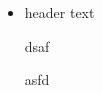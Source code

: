 \begin{itemize}
	\item<+>[]
		\begin{block}{header} 
			text
			 
			dsaf
			
			asfd
		\end{block}\vspace{-2em}
\end{itemize}










